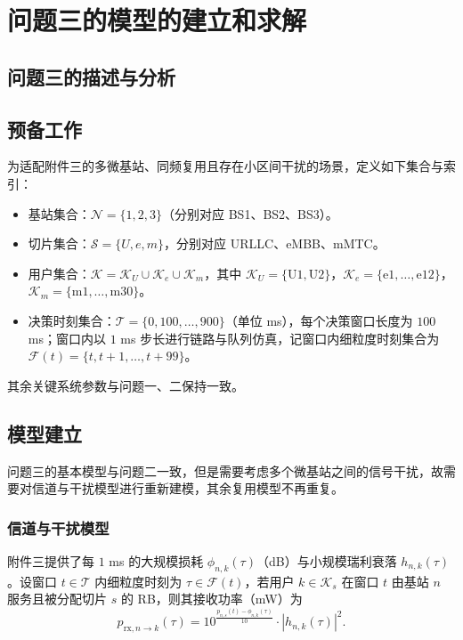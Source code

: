 \section{问题三的模型的建立和求解}
\subsection{问题三的描述与分析}

\subsection{预备工作}


为适配附件三的多微基站、同频复用且存在小区间干扰的场景，定义如下集合与索引：

\begin{itemize}
  \item 基站集合：$\mathcal{N}=\{1,2,3\}$（分别对应 BS1、BS2、BS3）。
  \item 切片集合：$\mathcal{S}=\{U,e,m\}$，分别对应 URLLC、eMBB、mMTC。
  \item 用户集合：$\mathcal{K}=\mathcal{K}_U\cup\mathcal{K}_e\cup\mathcal{K}_m$，其中 $\mathcal{K}_U=\{\mathrm{U1},\mathrm{U2}\}$，$\mathcal{K}_e=\{\mathrm{e1},\dots,\mathrm{e12}\}$，$\mathcal{K}_m=\{\mathrm{m1},\dots,\mathrm{m30}\}$。
  \item 决策时刻集合：$\mathcal{T}=\{0,100,\dots,900\}$（单位 ms），每个决策窗口长度为 $100$ ms；窗口内以 $1$ ms 步长进行链路与队列仿真，记窗口内细粒度时刻集合为 $\mathcal{F}(t)=\{t,t+1,\dots,t+99\}$。
\end{itemize}

其余关键系统参数与问题一、二保持一致。

\subsection{模型建立}
问题三的基本模型与问题二一致，但是需要考虑多个微基站之间的信号干扰，故需要对信道与干扰模型进行重新建模，其余复用模型不再重复。

\subsubsection{信道与干扰模型}

附件三提供了每 $1$ ms 的大规模损耗 $\phi_{n,k}(\tau)$（dB）与小规模瑞利衰落 $h_{n,k}(\tau)$。设窗口 $t\in\mathcal{T}$ 内细粒度时刻为 $\tau\in\mathcal{F}(t)$，若用户 $k\in\mathcal{K}_s$ 在窗口 $t$ 由基站 $n$ 服务且被分配切片 $s$ 的 RB，则其接收功率（mW）为
\begin{equation}
 p_{\mathrm{rx},n\to k}(\tau)=10^{\frac{p_{n,s}(t)-\phi_{n,k}(\tau)}{10}}\cdot |h_{n,k}(\tau)|^2.
\end{equation}

